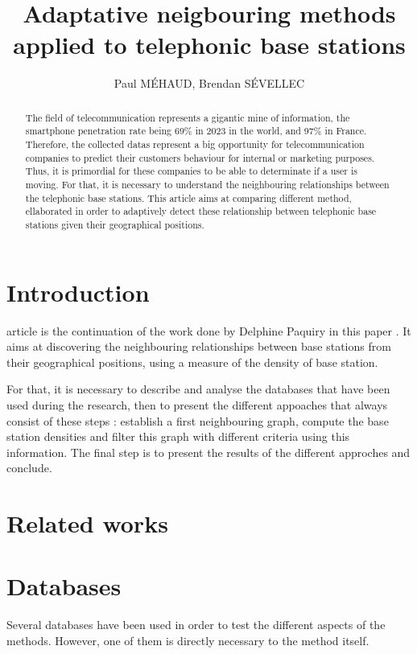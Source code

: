 \documentclass[lettersize,journal,english]{IEEEtran}
\title{Adaptative neigbouring methods applied to telephonic base stations}
\author{Paul MÉHAUD, Brendan SÉVELLEC}
\begin{document}
\maketitle

\begin{abstract}
  The field of telecommunication represents a gigantic mine of information, the smartphone penetration rate being 69\%
  in 2023 in the world, and 97\% in France. Therefore, the collected datas represent a big opportunity for telecommunication
  companies to predict their customers behaviour for internal or marketing purposes. Thus, it is primordial for these companies
  to be able to determinate if a user is moving. For that, it is necessary to understand the neighbouring relationships between the 
  telephonic base stations. This article aims at comparing different method, ellaborated in order to adaptively detect these
  relationship between telephonic base stations given their geographical positions.
\end{abstract}

\section{Introduction}
     article is the continuation of the work done by Delphine Paquiry in this paper \cite{art_del_paq}.
    It aims at discovering the neighbouring relationships between base stations from their geographical positions, using a 
    measure of the density of base station.

    For that, it is necessary to describe and analyse the databases that have been used during the research, then to present 
    the different appoaches that always consist of these steps : establish a first neighbouring graph, compute the base station 
    densities and filter this graph with different criteria using this information. The final step is to present the results
    of the different approches and conclude.
\section{Related works}

\section{Databases}
    Several databases have been used in order to test the different aspects of the methods. However, one of
    them is directly necessary to the method itself.
\end{document}
